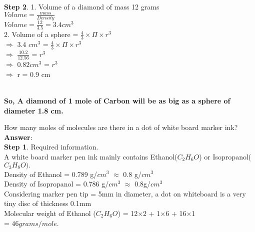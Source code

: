 \documentclass[11pt]{exam}
\begin{document}
\begin{questions}
{\begin{minipage}{38em}
\textbf{Step 2}.  1. Volume of a diamond of mass 12 grams \\
                     $Volume = \frac{mass}{Density}$ \\
                     $ Volume = \frac{12}{3.5} = 3.4 cm^{3}$ \\
                     
                  2. Volume of a sphere = $ \frac{4}{3} \times \Pi \times r^{3}$ \\
                    $\Longrightarrow$ 3.4 $cm^{3}$ = $ \frac{4}{3} \times \Pi \times r^{3}$ \\
                    $\Longrightarrow$ $\frac{10.2}{12.56}$ = $r^{3}$ \\
                    $\Longrightarrow$ $0.82 cm^{3}$ = $r^{3}$ \\
                    $\Longrightarrow$ r = 0.9 cm \\

 \end{minipage}} \\
 
 \textbf{So, A diamond of 1 mole of Carbon will be as big as a sphere of diameter 1.8 cm.} \\ 

                    
\question
\label{Q7: A dot of ink}

How many moles of molecules are there in a dot of white board marker ink? \\
\textbf{Answer}: \\
\textbf{Step 1}. Required information. \\
A white board marker pen ink mainly contains Ethanol($C_{2}H_{6}O$) or Isopropanol($C_{3}H_{8}O).$ \\
Density of Ethanol = 0.789 g/$cm^{3}$ $\approx$ 0.8 g/$cm^{3}$\\
Density of Isopropanol = 0.786 g/$cm^{3}$ $\approx$ 0.8g/$cm^{3}$\\
Considering marker pen tip = 5mm in diameter, a dot on whiteboard is a very tiny disc of thickness 0.1mm\\
Molecular weight of Ethanol ($C_{2}H_{6}O$) = 12$\times$2 + 1$\times$6 + 16$\times$1 \\
 = $46 grams/mole.$ \\ 

\fbox{\begin{minipage}{38em} 
                                           

\end{minipage}}
\end{questions}
\end{document}
